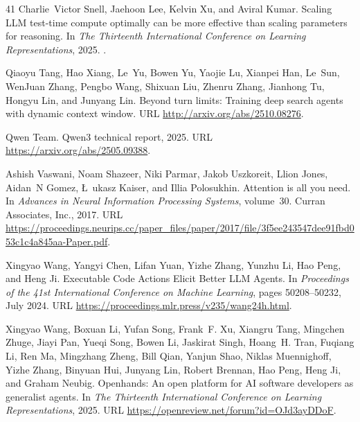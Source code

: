 \documentclass{article}
\begin{document}
\begin{thebibliography}{41}
Charlie~Victor Snell, Jaehoon Lee, Kelvin Xu, and Aviral Kumar.
\newblock Scaling {LLM} test-time compute optimally can be more effective than scaling parameters for reasoning.
\newblock In \emph{The Thirteenth International Conference on Learning Representations}, 2025.
\newblock {}.

Qiaoyu Tang, Hao Xiang, Le~Yu, Bowen Yu, Yaojie Lu, Xianpei Han, Le~Sun, {WenJuan} Zhang, Pengbo Wang, Shixuan Liu, Zhenru Zhang, Jianhong Tu, Hongyu Lin, and Junyang Lin.
\newblock Beyond turn limits: Training deep search agents with dynamic context window.
\newblock URL \url{http://arxiv.org/abs/2510.08276}.

Qwen Team.
\newblock Qwen3 technical report, 2025.
\newblock URL \url{https://arxiv.org/abs/2505.09388}.

Ashish Vaswani, Noam Shazeer, Niki Parmar, Jakob Uszkoreit, Llion Jones, Aidan~N Gomez, Ł~ukasz Kaiser, and Illia Polosukhin.
\newblock Attention is all you need.
\newblock In \emph{Advances in Neural Information Processing Systems}, volume~30. Curran Associates, Inc., 2017.
\newblock URL \url{https://proceedings.neurips.cc/paper_files/paper/2017/file/3f5ee243547dee91fbd053c1c4a845aa-Paper.pdf}.

Xingyao Wang, Yangyi Chen, Lifan Yuan, Yizhe Zhang, Yunzhu Li, Hao Peng, and Heng Ji.
\newblock Executable {Code} {Actions} {Elicit} {Better} {LLM} {Agents}.
\newblock In \emph{Proceedings of the 41st {International} {Conference} on {Machine} {Learning}}, pages 50208--50232, July 2024.
\newblock URL \url{https://proceedings.mlr.press/v235/wang24h.html}.

Xingyao Wang, Boxuan Li, Yufan Song, Frank~F. Xu, Xiangru Tang, Mingchen Zhuge, Jiayi Pan, Yueqi Song, Bowen Li, Jaskirat Singh, Hoang~H. Tran, Fuqiang Li, Ren Ma, Mingzhang Zheng, Bill Qian, Yanjun Shao, Niklas Muennighoff, Yizhe Zhang, Binyuan Hui, Junyang Lin, Robert Brennan, Hao Peng, Heng Ji, and Graham Neubig.
\newblock Openhands: An open platform for {AI} software developers as generalist agents.
\newblock In \emph{The Thirteenth International Conference on Learning Representations}, 2025.
\newblock URL \url{https://openreview.net/forum?id=OJd3ayDDoF}.


\end{thebibliography}
\end{document}
